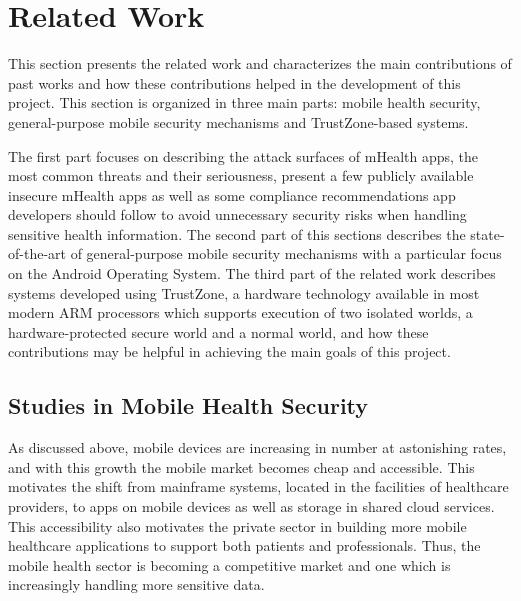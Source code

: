 
% 
% 
\section{Related Work}


This section presents the related work and characterizes the main contributions of past works and how these contributions helped in the development of this project. This section is organized in three main parts: mobile health security, general-purpose mobile security mechanisms and TrustZone-based systems.

The first part focuses on describing the attack surfaces of mHealth apps, the most common threats and their seriousness, present a few publicly available insecure mHealth apps as well as some compliance recommendations app developers should follow to avoid unnecessary security risks when handling sensitive health information.
The second part of this sections describes the state-of-the-art of general-purpose mobile security mechanisms with a particular focus on the Android Operating System.
The third part of the related work describes systems developed using TrustZone, a hardware technology available in most modern ARM processors which supports execution of two isolated worlds, a hardware-protected secure world and a normal world, and how these contributions may be helpful in achieving the main goals of this project. 

\subsection{Studies in Mobile Health Security}
\label{sec:mhealth}

As discussed above, mobile devices are increasing in number at astonishing rates, and with this growth the mobile market becomes cheap and accessible. This motivates the shift from mainframe systems, located in the facilities of healthcare providers, to apps on mobile devices as well as storage in shared cloud services. This accessibility also motivates the private sector in building more mobile healthcare applications to support both patients and professionals. Thus, the mobile health sector is becoming a competitive market and one which is increasingly handling more sensitive data.


